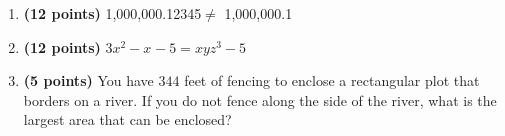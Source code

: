 \documentclass[12pt]{amsart}
\begin{document}
\begin{enumerate}
\vfill 
\def \a{7}\def \atwoone{1}\def \atwotwo{5}\def \atwothree{3}\def \btwothree{7}\def \sumtwothree{10}\def \diftwothree{-4}\def \bigtwothree{300}\def \powtwothree{343}\def \logtwothree{0.5645750340535797}\def \factortwothree{51}\def \atwofour{1.38}\def \btwofour{1.843}\def \tooshorttwofour{10.1}\def \moneytwofour{10.10}\def \longertwofour{10.10000}\def \atwofive{0.12}\def \btwofive{0.12346}\def \athreeone{6}\def \bthreeone{8}\def \setthreetwo{[2, 5, 6]}\def \athreetwo{2}\def \bthreetwo{5}\def \cthreetwo{6}\def \controlthreethree{-4}\def \athreethree{4}\def \topthreethree{0}\def \athreefour{4}\def \bthreefour{1}\def \listthreefour{[1, 2, 3, 5]}\def \afourone{12}\def \bfourone{4}\def \fracfourone{3}\def \rootfourtwo{20}\def \simplifiedfourtwo{2 \sqrt{5}}\def \sqrtlistfourtwo{[2, 5]}\def \outfourtwo{2}\def \infourtwo{5}\def \wowfourtwo{1}\def \afourthree{5}\def \nicethreefour{3x^{2}-x^{}+5}\def \nastythreefour{xyz^{3}+5}\def \cfourthree{4}\def \dfourthree{9}\def \infourthree{4x^{}}\def \outfourthree{+9y^{}}\def \afourfour{1855192}\def \nicefourfour{1,855,192}\def \goodfourfour{1,000,000.12345}\def \badfourfour{1,000,000.1}
\item {\bf (12 points)} 
  \goodfourfour $\neq$ \badfourfour 
\vfill 
\def \a{7}\def \atwoone{1}\def \atwotwo{-2}\def \atwothree{1}\def \btwothree{9}\def \sumtwothree{10}\def \diftwothree{-8}\def \bigtwothree{100}\def \powtwothree{9}\def \logtwothree{0.0}\def \factortwothree{187}\def \atwofour{1.32}\def \btwofour{1.265}\def \tooshorttwofour{10.1}\def \moneytwofour{10.10}\def \longertwofour{10.10000}\def \atwofive{0.12}\def \btwofive{0.12346}\def \athreeone{6}\def \bthreeone{5}\def \setthreetwo{[12, 6, 9]}\def \athreetwo{12}\def \bthreetwo{6}\def \cthreetwo{9}\def \controlthreethree{4}\def \athreethree{3}\def \topthreethree{0}\def \athreefour{3}\def \bthreefour{2}\def \listthreefour{[1, 2, 4, 5]}\def \afourone{4}\def \bfourone{-8}\def \fracfourone{\frac{-1}{2}}\def \rootfourtwo{8}\def \simplifiedfourtwo{2 \sqrt{2}}\def \sqrtlistfourtwo{[2, 2]}\def \outfourtwo{2}\def \infourtwo{2}\def \wowfourtwo{1}\def \afourthree{-5}\def \nicethreefour{3x^{2}-x^{}-5}\def \nastythreefour{xyz^{3}-5}\def \cfourthree{-4}\def \dfourthree{-10}\def \infourthree{-4x^{}}\def \outfourthree{-10y^{}}\def \afourfour{1024902}\def \nicefourfour{1,024,902}\def \goodfourfour{1,000,000.12345}\def \badfourfour{1,000,000.1}
\item {\bf (12 points)} 
  $\nicethreefour = \nastythreefour$ 
\vfill 
\newpage\def \x{86}\def \y{172}\def \L{344}\def \area{14792}
\item {\bf (5 points)} 
 You have $\L$ feet of fencing to enclose a rectangular plot that borders on a river. If you do not fence along the side of the river, what is the largest area that can be enclosed? \\


\end{enumerate}
\end{document}
